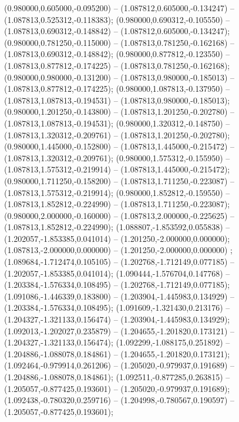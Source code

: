  (0.980000,0.605000,-0.095200) -- (1.087812,0.605000,-0.134247) -- (1.087813,0.525312,-0.118383);
 (0.980000,0.690312,-0.105550) -- (1.087813,0.690312,-0.148842) -- (1.087812,0.605000,-0.134247);
 (0.980000,0.781250,-0.115000) -- (1.087813,0.781250,-0.162168) -- (1.087813,0.690312,-0.148842);
 (0.980000,0.877812,-0.123550) -- (1.087813,0.877812,-0.174225) -- (1.087813,0.781250,-0.162168);
 (0.980000,0.980000,-0.131200) -- (1.087813,0.980000,-0.185013) -- (1.087813,0.877812,-0.174225);
 (0.980000,1.087813,-0.137950) -- (1.087813,1.087813,-0.194531) -- (1.087813,0.980000,-0.185013);
 (0.980000,1.201250,-0.143800) -- (1.087813,1.201250,-0.202780) -- (1.087813,1.087813,-0.194531);
 (0.980000,1.320312,-0.148750) -- (1.087813,1.320312,-0.209761) -- (1.087813,1.201250,-0.202780);
 (0.980000,1.445000,-0.152800) -- (1.087813,1.445000,-0.215472) -- (1.087813,1.320312,-0.209761);
 (0.980000,1.575312,-0.155950) -- (1.087813,1.575312,-0.219914) -- (1.087813,1.445000,-0.215472);
 (0.980000,1.711250,-0.158200) -- (1.087813,1.711250,-0.223087) -- (1.087813,1.575312,-0.219914);
 (0.980000,1.852812,-0.159550) -- (1.087813,1.852812,-0.224990) -- (1.087813,1.711250,-0.223087);
 (0.980000,2.000000,-0.160000) -- (1.087813,2.000000,-0.225625) -- (1.087813,1.852812,-0.224990);
 (1.088807,-1.853592,0.055838) -- (1.202057,-1.853385,0.041014) -- (1.201250,-2.000000,0.000000);
 (1.087813,-2.000000,0.000000) -- (1.201250,-2.000000,0.000000) ;
 (1.089684,-1.712474,0.105105) -- (1.202768,-1.712149,0.077185) -- (1.202057,-1.853385,0.041014);
 (1.090444,-1.576704,0.147768) -- (1.203384,-1.576334,0.108495) -- (1.202768,-1.712149,0.077185);
 (1.091086,-1.446339,0.183800) -- (1.203904,-1.445983,0.134929) -- (1.203384,-1.576334,0.108495);
 (1.091609,-1.321430,0.213176) -- (1.204327,-1.321133,0.156474) -- (1.203904,-1.445983,0.134929);
 (1.092013,-1.202027,0.235879) -- (1.204655,-1.201820,0.173121) -- (1.204327,-1.321133,0.156474);
 (1.092299,-1.088175,0.251892) -- (1.204886,-1.088078,0.184861) -- (1.204655,-1.201820,0.173121);
 (1.092464,-0.979914,0.261206) -- (1.205020,-0.979937,0.191689) -- (1.204886,-1.088078,0.184861);
 (1.092511,-0.877285,0.263815) -- (1.205057,-0.877425,0.193601) -- (1.205020,-0.979937,0.191689);
 (1.092438,-0.780320,0.259716) -- (1.204998,-0.780567,0.190597) -- (1.205057,-0.877425,0.193601);
